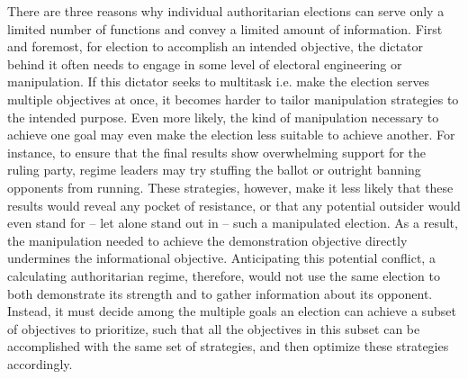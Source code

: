 \documentclass[12pt]{article}
\newcommand{\1}{\mathbbm{1}}
\begin{document}
There are three reasons why individual authoritarian elections can serve only a limited number of functions and convey a limited amount of information. First and foremost, for election to accomplish an intended objective, the dictator behind it often needs to engage in some level of electoral engineering or manipulation. If this dictator seeks to multitask i.e. make the election serves multiple objectives at once, it becomes harder to tailor manipulation strategies to the intended purpose. Even more likely, the kind of manipulation necessary to achieve one goal may even make the election less suitable to achieve another. For instance, to ensure that the final results show overwhelming support for the ruling party, regime leaders may try stuffing the ballot or outright banning opponents from running. These strategies, however, make it less likely that these results would reveal any pocket of resistance, or that any potential outsider would even stand for -- let alone stand out in -- such a manipulated election. As a result, the manipulation needed to achieve the demonstration objective directly undermines the informational objective. Anticipating this potential conflict, a calculating authoritarian regime, therefore, would not use the same election to both demonstrate its strength and to gather information about its opponent. Instead, it must decide among the multiple goals an election can achieve a subset of objectives to prioritize, such that all the objectives in this subset can be accomplished with the same set of strategies, and then optimize these strategies accordingly.
\end{document}

